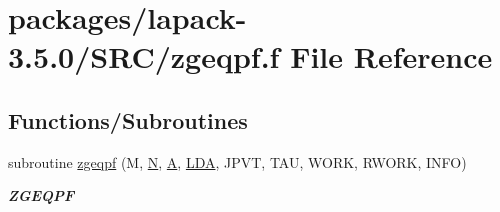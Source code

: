 \hypertarget{zgeqpf_8f}{}\section{packages/lapack-\/3.5.0/\+S\+R\+C/zgeqpf.f File Reference}
\label{zgeqpf_8f}
\subsection*{Functions/\+Subroutines}
\begin{DoxyCompactItemize}
\item 
subroutine \hyperlink{group__complex16GEcomputational_ga081af8445fcaa6804c99c11b280a60c3}{zgeqpf} (M, \hyperlink{polmisc_8c_a0240ac851181b84ac374872dc5434ee4}{N}, \hyperlink{classA}{A}, \hyperlink{example__user_8c_ae946da542ce0db94dced19b2ecefd1aa}{L\+D\+A}, J\+P\+V\+T, T\+A\+U, W\+O\+R\+K, R\+W\+O\+R\+K, I\+N\+F\+O)
\begin{DoxyCompactList}\small\item\em {\bfseries Z\+G\+E\+Q\+P\+F} \end{DoxyCompactList}\end{DoxyCompactItemize}
